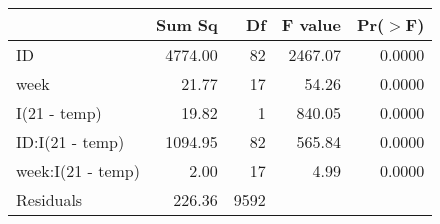 \begin{table}[ht]
\centering
\begin{tabular}{lrrrr}
  \hline
 & Sum Sq & Df & F value & Pr($>$F) \\ 
  \hline
ID & 4774.00 & 82 & 2467.07 & 0.0000 \\ 
  week & 21.77 & 17 & 54.26 & 0.0000 \\ 
  I(21 - temp) & 19.82 & 1 & 840.05 & 0.0000 \\ 
  ID:I(21 - temp) & 1094.95 & 82 & 565.84 & 0.0000 \\ 
  week:I(21 - temp) & 2.00 & 17 & 4.99 & 0.0000 \\ 
  Residuals & 226.36 & 9592 &  &  \\ 
   \hline
\end{tabular}
\end{table}
